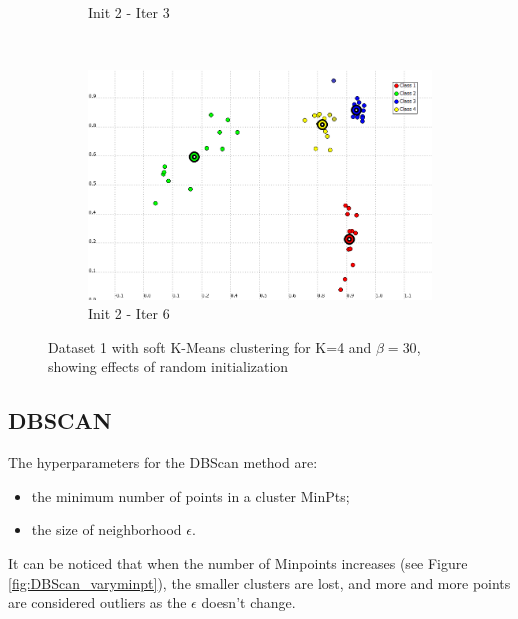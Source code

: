 \documentclass[a4paper,10pt]{article}
\begin{document}
\begin{figure}[H]
\begin{subfigure}[t]{0.2\textwidth}
      \caption{Init 2 - Iter 3}
      \label{fig:K-Means-4K-beta-30-it3-2}
     \end{subfigure}
      ~
    \begin{subfigure}[t]{0.2\textwidth}
      \centering
      \includegraphics[width=\textwidth]{pictures/K-Means-4K-beta-30-it6(2).png}
      \caption{Init 2 - Iter 6}
      \label{fig:K-Means-4K-beta-30-it6-2}
     \end{subfigure}
     \caption{Dataset 1 with soft K-Means clustering for K=4 and $\beta=30$, showing effects of random initialization}
     \label{fig:kmeans_init}
\end{figure}


\subsection{DBSCAN}

The hyperparameters for the DBScan method are:
\begin{itemize}
\item the minimum number of points in a cluster MinPts;
\item the size of neighborhood $\epsilon$.
\end{itemize}

It can be noticed that when the number of Minpoints increases (see Figure \ref{fig:DBScan_varyminpt}), the smaller clusters are lost, and more and more points are considered outliers as the $\epsilon$ doesn't change.
\end{document}
